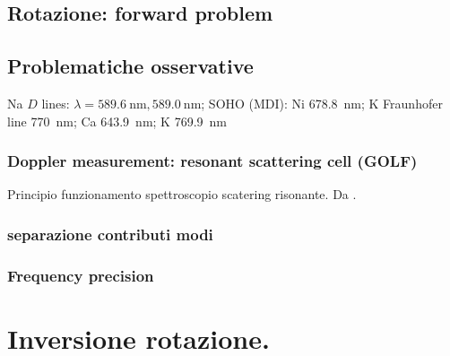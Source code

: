 \endgroup

\section{Rotazione: forward problem}

\begin{refsection}

\begingroup
\nocite{*}
\let\clearpage\relax

\printbibliography[check=modesfreqobs,keyword={rev},heading=bibsec,title={\textcolor{ochre}{Biblio about: ''Osservazione dei modi: strumenti e splitting dovuto alla rotazione.''}}]
\printbibliography[check=modesfreqobs,notkeyword={rev},heading=bibsec,title={\textcolor{ochre}{Other refs about: ''Osservazione dei modi: strumenti e splitting dovuto alla rotazione.''}}]


\endgroup

\section{Problematiche osservative}

Na $D$ lines: $\lambda=\SI{589.6}{\nano\meter},\SI{589.0}{\nano\meter}$; SOHO (MDI): Ni \SI{678.8}{\nano\meter}; K Fraunhofer line \SI{770}{\nano\meter}; Ca \SI{643.9}{\nano\meter}; K \SI{769.9}{\nano\meter}

\subsection{Doppler measurement: resonant scattering cell (GOLF)}

Principio funzionamento spettroscopio scatering risonante. Da \cite{brookes1978resonant}.

\subsection{separazione contributi modi}
\subsection{Frequency precision}

\end{refsection}


{\let\clearpage\relax
\chapter{Inversione rotazione.}}
\PartialToc

